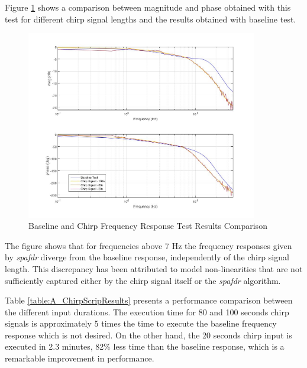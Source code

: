 Figure \ref{fig:A_ChirpScripResults} shows a comparison between magnitude and phase obtained with this test for different chirp signal lengths and the results obtained with baseline test.

\begin{figure}[H]
	\centering
	\centerline{\includegraphics[width=0.9\textwidth]{Figuras/4.DynamicStifinessOptimizationAlgorithm/4-3-2-1-ChirpScripResults.jpg}}
	\caption{Baseline and Chirp Frequency Response Test Results Comparison}
	\label{fig:A_ChirpScripResults}
\end{figure}

The figure shows that for frequencies above 7 Hz the frequency responses given by \textit{spafdr} diverge from the baseline response, independently of the chirp signal length. This discrepancy has been attributed to model non-linearities that are not sufficiently captured either by the chirp signal itself or the \textit{spafdr} algorithm. 

Table \ref{table:A_ChirpScripResults} presents a performance comparison between the different input durations. The execution time for 80 and 100 seconds chirp signals is approximately 5 times the time to execute the baseline frequency response which is not desired. On the other hand, the 20 seconds chirp input is executed in 2.3 minutes, 82\% less time than the baseline response, which is a remarkable improvement in performance.

